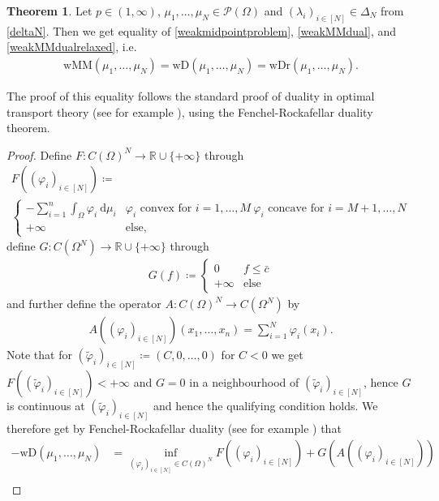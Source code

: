 \documentclass[letterpaper]{amsart}
\newcommand{\RR}{\mathbb{R}}
\newcommand{\dd}{\mathrm{d}}
\theoremstyle{definition}
\newtheorem{thm}{Theorem}[section]
\begin{document}
\begin{thm}\label{weakMMdualthm}
	Let $p\in (1,\infty)$,  $\mu_1,\dots,\mu_N\in\mathcal P(\Omega)$ and $(\lambda_i)_{i\in[N]}\in\Delta_N$ from \eqref{deltaN}. Then we get equality of \eqref{weakmidpointproblem}, \eqref{weakMMdual}, and \eqref{weakMMdualrelaxed}, i.e.
	\begin{gather*}
		\text{wMM}(\mu_1,\dots,\mu_N)=\text{wD}(\mu_1,\dots,\mu_N)=\text{wDr}(\mu_1,\dots,\mu_N).
	\end{gather*}
\end{thm}
The proof of this equality follows the standard proof of duality in optimal transport theory (see for example \cite[Thm 1.3]{villani2003}), using the Fenchel-Rockafellar duality theorem.
\begin{proof}
	Define $F:C(\Omega)^N\rightarrow\RR\cup\{+\infty\}$ through
	\begin{gather*}
		F((\varphi_i)_{i\in[N]})\coloneqq\\
		\begin{cases}
			-\sum_{i=1}^n\int_\Omega\varphi_i\ \dd\mu_i&\varphi_i\text{ convex for }i=1,\dots,M\ \varphi_i\text{ concave for }i=M+1,\dots,N\\
			+\infty&\text{else,}
		\end{cases}
	\end{gather*}
	define $G:C(\Omega^N)\rightarrow\RR\cup\{+\infty\}$ through
	\begin{gather*}
		G(f)\coloneqq
		\begin{cases}
			0&f\leq \bar c\\
			+\infty&\text{else}
		\end{cases}
	\end{gather*}
	and further define the operator $A:C(\Omega)^N\rightarrow C(\Omega^N)$ by
	\begin{gather*}
		A((\varphi_i)_{i\in[N]})(x_1,\dots,x_n)=\sum_{i=1}^N\varphi_i(x_i).
	\end{gather*}
	Note that for $(\tilde\varphi_i)_{i\in[N]}\coloneqq(C,0,\dots,0)$ for $C<0$ we get
	$F((\tilde\varphi_i)_{i\in[N]})<+\infty$ and $G=0$ in a neighbourhood of $(\tilde\varphi_i)_{i\in[N]}$, hence $G$ is continuous at $(\tilde\varphi_i)_{i\in[N]}$ and hence the qualifying condition holds.
	We therefore get by Fenchel-Rockafellar duality (see for example \cite[Thm 4.1, Rmk 4.2]{ekeland1976}) that
	\begin{align*}
		-\text{wD}(\mu_1,\dots,\mu_N)&=\inf_{(\varphi_i)_{i\in[N]}\in C(\Omega)^N} F((\varphi_i)_{i\in[N]})+ G(A((\varphi_i)_{i\in[N]}))\\

\end{align*}
\end{proof}
\end{document}
